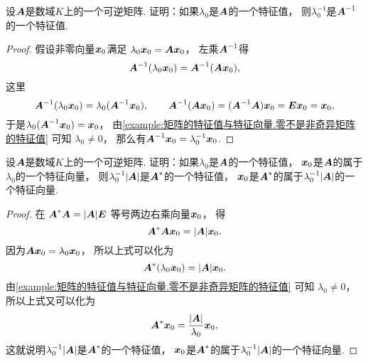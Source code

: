 \begin{example}\label{example:矩阵的特征值与特征向量.矩阵的多项式的特征值3}
设\(\boldsymbol{A}\)是数域\(K\)上的一个可逆矩阵.
证明：如果\(\lambda_0\)是\(\boldsymbol{A}\)的一个特征值，
则\(\lambda_0^{-1}\)是\(\boldsymbol{A}^{-1}\)的一个特征值.
\begin{proof}
假设非零向量\(\boldsymbol{x}_0\)满足
\(\lambda_0 \boldsymbol{x}_0 = \boldsymbol{A} \boldsymbol{x}_0\)，
左乘\(\boldsymbol{A}^{-1}\)得\begin{equation*}
	\boldsymbol{A}^{-1} (\lambda_0 \boldsymbol{x}_0)
	= \boldsymbol{A}^{-1} (\boldsymbol{A} \boldsymbol{x}_0),
\end{equation*}
这里\begin{equation*}
	\boldsymbol{A}^{-1} (\lambda_0 \boldsymbol{x}_0)
	= \lambda_0 (\boldsymbol{A}^{-1} \boldsymbol{x}_0),
	\qquad
	\boldsymbol{A}^{-1} (\boldsymbol{A} \boldsymbol{x}_0)
	= (\boldsymbol{A}^{-1} \boldsymbol{A}) \boldsymbol{x}_0
	= \boldsymbol{E} \boldsymbol{x}_0
	= \boldsymbol{x}_0,
\end{equation*}
于是\(\lambda_0 (\boldsymbol{A}^{-1} \boldsymbol{x}_0) = \boldsymbol{x}_0\)，
由\cref{example:矩阵的特征值与特征向量.零不是非奇异矩阵的特征值} 可知
\(\lambda_0 \neq 0\)，
那么有\(\boldsymbol{A}^{-1} \boldsymbol{x}_0 = \lambda_0^{-1} \boldsymbol{x}_0\).
\end{proof}
\end{example}
\begin{example}\label{example:矩阵的特征值与特征向量.伴随矩阵的特征值}
设\(\boldsymbol{A}\)是数域\(K\)上的一个可逆矩阵.
证明：如果\(\lambda_0\)是\(\boldsymbol{A}\)的一个特征值，
\(\boldsymbol{x}_0\)是\(\boldsymbol{A}\)的属于\(\lambda_0\)的一个特征向量，
则\(\lambda_0^{-1} \abs{\boldsymbol{A}}\)是\(\boldsymbol{A}^*\)的一个特征值，
\(\boldsymbol{x}_0\)是\(\boldsymbol{A}^*\)的属于\(\lambda_0^{-1} \abs{\boldsymbol{A}}\)的一个特征向量.
\begin{proof}
在 \hyperref[equation:行列式.伴随矩阵.恒等式1]{\(\boldsymbol{A}^* \boldsymbol{A} = \abs{\boldsymbol{A}} \boldsymbol{E}\)}
等号两边右乘向量\(\boldsymbol{x}_0\)，
得\begin{equation*}
	\boldsymbol{A}^* \boldsymbol{A} \boldsymbol{x}_0
	= \abs{\boldsymbol{A}} \boldsymbol{x}_0.
\end{equation*}
因为\(\boldsymbol{A} \boldsymbol{x}_0 = \lambda_0 \boldsymbol{x}_0\)，
所以上式可以化为\begin{equation*}
	\boldsymbol{A}^* (\lambda_0 \boldsymbol{x}_0)
	= \abs{\boldsymbol{A}} \boldsymbol{x}_0.
\end{equation*}
由\cref{example:矩阵的特征值与特征向量.零不是非奇异矩阵的特征值} 可知
\(\lambda_0 \neq 0\)，
所以上式又可以化为\begin{equation*}
	\boldsymbol{A}^* \boldsymbol{x}_0
	= \frac{\abs{\boldsymbol{A}}}{\lambda_0} \boldsymbol{x}_0,
\end{equation*}
这就说明\(\lambda_0^{-1} \abs{\boldsymbol{A}}\)是\(\boldsymbol{A}^*\)的一个特征值，
\(\boldsymbol{x}_0\)是\(\boldsymbol{A}^*\)的属于\(\lambda_0^{-1} \abs{\boldsymbol{A}}\)的一个特征向量.
\end{proof}
\end{example}
